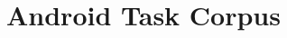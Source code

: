 \setcounter{chapter}{3}
\setcounter{rq}{1}


\chapter{Android Task Corpus}
\label{ch:android-corpus}









